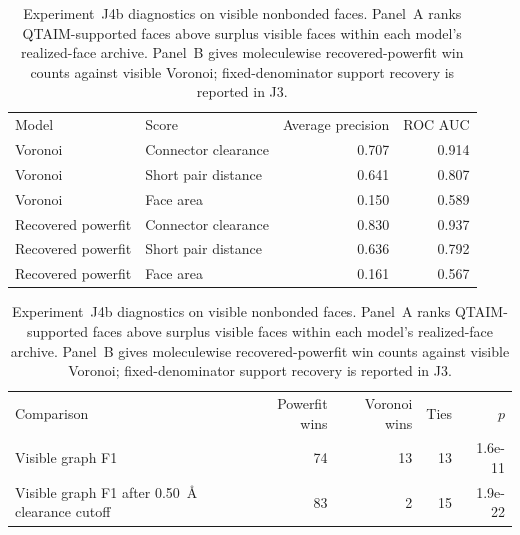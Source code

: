 \begin{table}[H]
\caption{Experiment~J4b diagnostics on visible nonbonded faces. Panel~A ranks QTAIM-supported faces above surplus visible faces within each model's realized-face archive. Panel~B gives moleculewise recovered-powerfit win counts against visible Voronoi; fixed-denominator support recovery is reported in J3.}
\label{tab:j4_clearance_ranking}
\centering
\footnotesize
\setlength{\tabcolsep}{4pt}
\renewcommand{\arraystretch}{1.10}

\begin{tabular}{>{\raggedright\arraybackslash}p{}>{\raggedright\arraybackslash}p{}rr}
\toprule
\multicolumn{4}{l}{\textbf{Panel A: visible nonbonded ranking diagnostics}} \\
\midrule
Model & Score & Average precision & ROC AUC \\
\midrule
Voronoi & Connector clearance & 0.707 & 0.914 \\
Voronoi & Short pair distance & 0.641 & 0.807 \\
Voronoi & Face area & 0.150 & 0.589 \\
Recovered powerfit & Connector clearance & 0.830 & 0.937 \\
Recovered powerfit & Short pair distance & 0.636 & 0.792 \\
Recovered powerfit & Face area & 0.161 & 0.567 \\
\bottomrule
\end{tabular}

\vspace{0.65em}

\begin{tabular}{>{\raggedright\arraybackslash}p{}rrrr}
\toprule
\multicolumn{5}{l}{\textbf{Panel B: moleculewise recovered-powerfit win counts}} \\
\midrule
Comparison & Powerfit wins & Voronoi wins & Ties & $p$ \\
\midrule
Visible graph F1 & 74 & 13 & 13 & 1.6e-11 \\
Visible graph F1 after 0.50~\AA{} clearance cutoff & 83 & 2 & 15 & 1.9e-22 \\
\bottomrule
\end{tabular}
\end{table}
